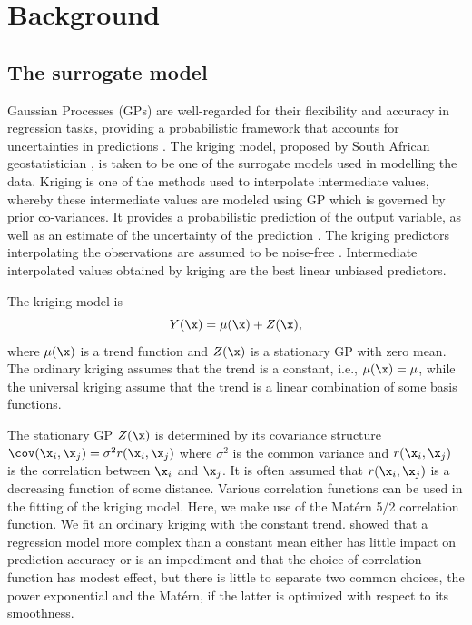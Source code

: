 \documentclass [PhD] {package/uclathes}
\begin{document}
\section{Background}

\subsection{The surrogate model}
Gaussian Processes (GPs) are well-regarded for their flexibility and accuracy in regression tasks, providing a probabilistic framework that accounts for uncertainties in predictions \parencite{snelson2008flexible}. The kriging model, proposed by South African geostatistician \textcite{krige1951statistical}, is taken to be one of the surrogate models used in modelling the data. Kriging is one of the methods used to interpolate intermediate values, whereby these intermediate values are modeled using  GP which is governed by prior co-variances.  It provides a probabilistic prediction of the output variable, as well as an estimate of the uncertainty of the prediction \parencite{chevalier2014kriginv}. The kriging predictors interpolating the observations are assumed to be noise-free \parencite{roustant2012dicekriging}. Intermediate interpolated values obtained by kriging are the best linear unbiased predictors. %

The  kriging model is
\begin{equation*}\label{eq:SK}
      Y(\x) = \mu(\x) + Z(\x),
\end{equation*}
where $\mu(\x)$ is a trend function and \(Z(\x)\) is a stationary GP with zero mean.
The ordinary kriging  assumes that the trend is a constant, i.e.,  $\mu(\x)=\mu$, while the universal kriging assume that the trend is a linear combination of some basis functions.

The stationary GP $Z(\x)$ is determined by its covariance structure $\cov(\x_i, \x_j) = \sigma^2 r(\x_i, \x_j)$ where $\sigma^2$ is the common variance and $r(\x_i, \x_j)$ is the correlation between $\x_i$ and $\x_j$. It is often assumed that $r(\x_i, \x_j)$ is a decreasing function of some distance. Various correlation functions can be used in the fitting of the kriging model. Here, we make use of the Mat\'ern 5/2 correlation function. We fit an ordinary kriging with the constant trend.  \textcite{chen2016analysis} showed that a regression model more complex than a constant mean either has little impact on prediction accuracy or is an impediment and that the choice of correlation function has modest effect, but there is little to separate two common choices, the power exponential and the Mat\'ern, if the latter is optimized with respect to its smoothness.
\end{document}
